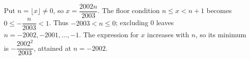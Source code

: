 Put $n=\lfloor x\rfloor\ne0$, so $x=\dfrac{2002n}{2003}$. The floor condition $n\le x<n+1$ becomes $0\le-\dfrac{n}{2003}<1$. Thus $-2003<n\le0$; excluding 0 leaves $n=-2002,-2001,\ldots,-1$. The expression for $x$ increases with $n$, so its minimum is $\boxed{-\dfrac{2002^2}{2003}}$, attained at $n=-2002$.

